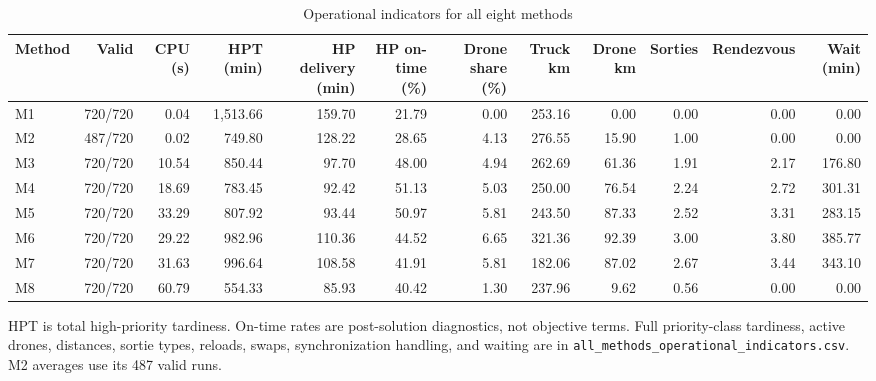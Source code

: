 \begin{table}[htbp]
\centering
\caption{Operational indicators for all eight methods}
\label{tab:all_methods_operational}
\scriptsize
\begin{tabular}{lrrrrrrrrrrr}
\toprule
Method & Valid & CPU (s) & HPT (min) & HP delivery (min) & HP on-time (\%) & Drone share (\%) & Truck km & Drone km & Sorties & Rendezvous & Wait (min) \\
\midrule
M1 & 720/720 & 0.04 & 1,513.66 & 159.70 & 21.79 & 0.00 & 253.16 & 0.00 & 0.00 & 0.00 & 0.00 \\
M2 & 487/720 & 0.02 & 749.80 & 128.22 & 28.65 & 4.13 & 276.55 & 15.90 & 1.00 & 0.00 & 0.00 \\
M3 & 720/720 & 10.54 & 850.44 & 97.70 & 48.00 & 4.94 & 262.69 & 61.36 & 1.91 & 2.17 & 176.80 \\
M4 & 720/720 & 18.69 & 783.45 & 92.42 & 51.13 & 5.03 & 250.00 & 76.54 & 2.24 & 2.72 & 301.31 \\
M5 & 720/720 & 33.29 & 807.92 & 93.44 & 50.97 & 5.81 & 243.50 & 87.33 & 2.52 & 3.31 & 283.15 \\
M6 & 720/720 & 29.22 & 982.96 & 110.36 & 44.52 & 6.65 & 321.36 & 92.39 & 3.00 & 3.80 & 385.77 \\
M7 & 720/720 & 31.63 & 996.64 & 108.58 & 41.91 & 5.81 & 182.06 & 87.02 & 2.67 & 3.44 & 343.10 \\
M8 & 720/720 & 60.79 & 554.33 & 85.93 & 40.42 & 1.30 & 237.96 & 9.62 & 0.56 & 0.00 & 0.00 \\
\bottomrule
\end{tabular}
\begin{minipage}{\textwidth}\footnotesize HPT is total high-priority tardiness. On-time rates are post-solution diagnostics, not objective terms. Full priority-class tardiness, active drones, distances, sortie types, reloads, swaps, synchronization handling, and waiting are in \texttt{all\_methods\_operational\_indicators.csv}. M2 averages use its 487 valid runs.\end{minipage}
\end{table}
